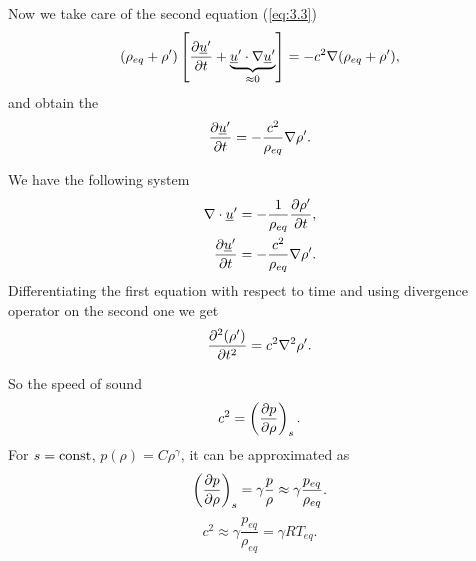 \documentclass[../main.tex]{subfiles}
\begin{document}
    Now we take care of the second equation (\ref{eq:3.3})
    \begin{displaymath}
      (\rho_{eq} + \rho') \left[ \frac{\partial \underline{u}'}{\partial t} + \underbrace{\underline{u}' \cdot \nabla \underline{u}'}_{\approx 0} \right] = - c^2 \nabla (\rho_{eq} + \rho'),
    \end{displaymath}
    and obtain the 
    \begin{displaymath}
      \frac{\partial \underline{u}'}{\partial t} = - \frac{c^2}{\rho_{eq}} \nabla \rho'.
    \end{displaymath}

    We have the following system
    \begin{align*}
      \nabla \cdot \underline{u}' = - \frac{1}{\rho_{eq}} \frac{\partial \rho'}{\partial t}, \\
      \frac{\partial \underline{u}'}{\partial t} = - \frac{c^2}{\rho_{eq}} \nabla \rho'.
    \end{align*}
    Differentiating the first equation with respect to time and using divergence operator on the second one we get
    \begin{displaymath}
      \frac{\partial^2 (\rho')}{\partial t ^ 2} = c^2 \nabla^2 \rho'.
    \end{displaymath}

    So the speed of sound
    \begin{displaymath}
      c^2 = \left( \frac{\partial p}{\partial \rho} \right)_s.
    \end{displaymath}
    For $s = \textrm{const}$, $p(\rho) = C \rho^\gamma$, it can be approximated as
    \begin{displaymath}
      \left( \frac{\partial p}{\partial \rho} \right)_s = \gamma \frac{p}{\rho} \approx \gamma\frac{p_{eq}}{\rho_{eq}}.
    \end{displaymath}
    \begin{displaymath}
      c^2 \approx \gamma \frac{p_{eq}}{\rho_{eq}} = \gamma R T_{eq}.
    \end{displaymath}
    
\end{document}

